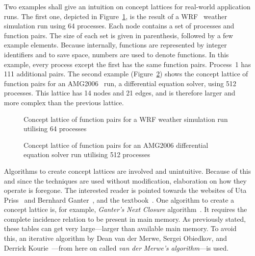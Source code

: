 \documentclass[a4paper, final, diplominf]{zih-template}
\begin{document}
Two examples shall give an intuition on concept lattices for real-world application runs.
The first one, depicted in Figure~\ref{fig:wrf-64p-concept-lattice}, is the result of a WRF~\cite{michalakes01, wrf} weather simulation run using 64 processes.
Each node contains a set of processes and function pairs.
The size of each set is given in parenthesis, followed by a few example elements.
Because internally, functions are represented by integer identifiers and to save space, numbers are used to denote functions.
In this example, every process except the first has the same function pairs.
Process~1 has 111 additional pairs.
The second example (Figure~\ref{fig:amg2006-512p-concept-lattice}) shows the concept lattice of function pairs for an AMG2006~\cite{amg} run, a differential equation solver, using 512 processes.
This lattice has 14 nodes and 21 edges, and is therefore larger and more complex than the previous lattice.
\begin{figure}[tb]
	\centering
	
	\vspace{0.5ex}
	\caption{Concept lattice of function pairs for a WRF weather simulation run utilising 64 processes}
	\label{fig:wrf-64p-concept-lattice}
	\vspace{0.5ex}
\end{figure}
\begin{figure}[tb]
	\centering
	
	\vspace{0.5ex}
	\caption{Concept lattice of function pairs for an AMG2006 differential equation solver run utilising 512 processes}
	\label{fig:amg2006-512p-concept-lattice}
	\vspace{0.5ex}
\end{figure}

Algorithms to create concept lattices are involved and unintuitive.
Because of this and since the techniques are used without modification, elaboration on how they operate is foregone.
The interested reader is pointed towards the websites of Uta Priss~\cite{priss} and Bernhard Ganter~\cite{ganter14}, and the textbook~\cite{ganter99}.
One algorithm to create a concept lattice is, for example, \emph{Ganter's Next Closure} algorithm~\cite{ganter84, ganter99}.
It requires the complete incidence relation to be present in main memory.
As previously stated, these tables can get very large---larger than available main memory.
To avoid this, an iterative algorithm by Dean van der Merwe, Sergei Obiedkov, and Derrick Kourie~\cite{van04}---from here on called \emph{van der Merwe's algorithm}---is used.
\end{document}
